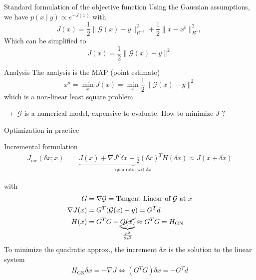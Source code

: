 \documentclass[10pt,aspectratio=169]{beamer}
\begin{document}
\begin{frame}{Standard formulation of the objective function}
Using the Gaussian assumptions, we have $p(x\mid y) \propto e^{-J(x)}$
with 
    \begin{equation}
    J(x) = \frac{1}{2}\|\mathcal{G}(x) - y \|_{R^{-1}}^2 + \frac{1}{2}\|x - x^b\|^2_{B^{-1}}
\end{equation}
Which can be simplified to
\begin{equation}
    J(x) = \frac{1}{2}\|\mathcal{G}(x) - y \|^2
\end{equation}

\begin{block}{Analysis}
The analysis is the MAP (point estimate)
\begin{equation}
    x^{a} = \min_{x} J(x) = \min_{x}\frac{1}{2}\|\mathcal{G}(x) - y \|^2
\end{equation}
which is a non-linear least square problem
\end{block}
$\rightarrow$ $\mathcal{G}$ is a numerical model, expensive to evaluate. How to minimize $J$ ?
\end{frame}
\begin{frame}{Optimization in practice}
\begin{block}{Incremental formulation}
\begin{align}
    J_{\text{inc}}(\delta x; x) &= \underbrace{J(x) +  \nabla J^T \delta x + \frac{1}{2} (\delta x)^T H (\delta x)}_{\text{quadratic wrt } \delta x } \approx J(x + \delta x)
\end{align}
\end{block}
with
\begin{align}
    G &= \nabla \mathcal{G} =\text{Tangent Linear of }\mathcal{G} \text{ at } x \\
    \nabla J(x) &= G^T (\mathcal{G}(x) - y) = G^Td \\
    H(x) &= G^TG + \underbrace{\cancel{Q(x)}}_{{\frac{\partial^2}{\partial x^2}}} \approx G^TG = H_{\text{GN}}
\end{align}
To minimize the quadratic approx., the increment $\delta x$ is the solution to the linear system
\begin{align}
    H_{\text{GN}} \delta x = -\nabla J \iff
    (G^T G) \delta x = -G^Td
\end{align}
\end{frame}
\end{document}
